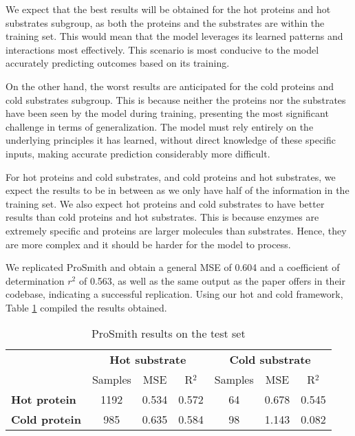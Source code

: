 We expect that the best results will be obtained for the hot proteins and hot substrates subgroup, 
as both the proteins and the substrates are within the training set. This would mean that 
the model leverages its learned patterns and interactions most effectively. 
This scenario is most conducive to the model accurately predicting outcomes based on its training.

On the other hand, the worst results are anticipated for the cold proteins and cold substrates subgroup. 
This is because neither the proteins nor the substrates have been seen by the model during training, 
presenting the most significant challenge in terms of generalization. The model must rely entirely 
on the underlying principles it has learned, without direct knowledge of these specific inputs, 
making accurate prediction considerably more difficult.

For hot proteins and cold substrates, and cold proteins and hot substrates, we expect the results to be in between as we only have half of the information in the training set. We also expect hot proteins and cold substrates to have better results than cold proteins and hot substrates. This is because enzymes are extremely specific and proteins are larger molecules than substrates. Hence, they are more complex and it should be harder for the model to process. 

We replicated ProSmith and obtain a general MSE of 0.604 and a coefficient of determination $r^2$ of 0.563, as well as the same output as the paper offers in their codebase, indicating a successful replication. Using our hot and cold framework, Table \ref{tab:prosmith_results} compiled the results obtained.

\begin{table}[ht]
  \centering
  \begin{tabular}{lcccccc}
  \hline
   & \multicolumn{3}{c}{\textbf{Hot substrate}} & \multicolumn{3}{c}{\textbf{Cold substrate}} \\
   & Samples & MSE & R\(^2\) & Samples & MSE & R\(^2\) \\ \hline
  \textbf{Hot protein}  & 1192 & 0.534 & 0.572 & 64 & 0.678 & 0.545 \\
  \textbf{Cold protein} & 985 & 0.635 & 0.584 & 98 & 1.143 & 0.082 \\ \hline
  \end{tabular}
  \caption{ProSmith results on the test set}
  \label{tab:prosmith_results}
\end{table}

